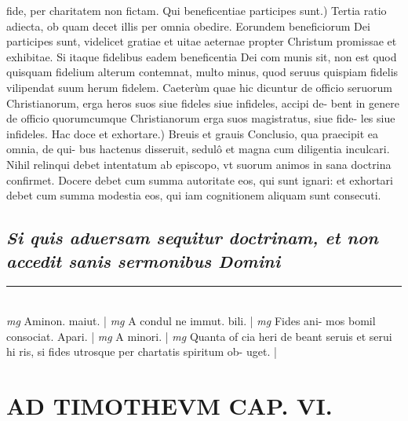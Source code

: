 \documentclass{article}
\begin{document}
\begin{pages}
fide, per charitatem non fictam.  \pend\pstart Qui beneficentiae participes sunt.) Tertia ratio adiecta, ob quam decet illis per omnia obedire. Eorundem beneficiorum Dei participes sunt, videlicet gratiae et uitae aeternae propter Christum promissae et exhibitae. Si itaque fidelibus eadem beneficentia Dei com munis sit, non est quod quisquam fidelium alterum contemnat, multo minus, quod seruus quispiam fidelis vilipendat suum herum fidelem. Caeterùm quae hic dicuntur de officio seruorum Christianorum, erga heros suos siue fideles siue infideles, accipi de- bent in genere de officio quorumcumque Christianorum erga suos magistratus, siue fide- les siue infideles.  \pend\pstart Hac doce et exhortare.) Breuis et grauis Conclusio, qua praecipit ea omnia, de qui- bus hactenus disseruit, sedulô et magna cum diligentia inculcari. Nihil relinqui debet intentatum ab episcopo, vt suorum animos in sana doctrina confirmet. Docere debet cum summa autoritate eos, qui sunt ignari: et exhortari debet cum summa modestia eos, qui iam cognitionem aliquam sunt consecuti.  \pend
{}
{}
\subsection*{\textit{Si quis aduersam sequitur doctrinam, et non accedit sanis sermonibus Domini }}\pstart  \pend
\vspace{0.5cm}\noindent
\vspace{0.2cm}\rule{1cm}{0.2pt}\\ 
\hspace{0.2cm}\textit{mg}
\footnotesize Aminon. maiut. 
\normalsize| 
\hspace{0.2cm}\textit{mg}
\footnotesize A condul ne immut. bili. 
\normalsize| 
\hspace{0.2cm}\textit{mg}
\footnotesize Fides ani- mos bomil consociat. Apari. 
\normalsize| 
\hspace{0.2cm}\textit{mg}
\footnotesize A minori. 
\normalsize| 
\hspace{0.2cm}\textit{mg}
\footnotesize Quanta of cia heri de beant seruis et serui hi ris, si fides utrosque per chartatis spiritum ob- uget. 
\normalsize| 
\section*{AD TIMOTHEVM CAP. VI. }
\marginpar{[ p.121 ]}
{}

\end{pages}
\end{document}
